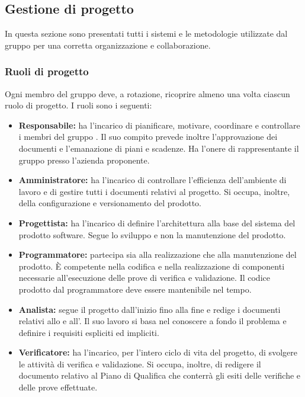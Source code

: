 \subsection{Gestione di progetto}
In questa sezione sono presentati tutti i sistemi e le metodologie utilizzate dal gruppo per una corretta organizzazione e collaborazione.
\subsubsection{Ruoli di progetto}
Ogni membro del gruppo deve, a rotazione, ricoprire almeno una volta ciascun ruolo di progetto.
I ruoli sono i seguenti:
\begin{itemize}
\item \textbf{Responsabile:} ha l'incarico di pianificare, motivare, coordinare e controllare i membri del gruppo \Gruppo.
Il suo compito prevede inoltre l'approvazione dei documenti e l'emanazione di piani e scadenze.
Ha l'onere di rappresentante il gruppo presso l'azienda proponente.
\item \textbf{Amministratore:} ha l'incarico di controllare l'efficienza dell'ambiente di lavoro e di gestire tutti i documenti relativi al progetto.
Si occupa, inoltre, della configurazione e versionamento del prodotto.
\item \textbf{Progettista:} ha l'incarico di definire l'architettura alla base del sistema del prodotto software.
Segue lo sviluppo e non la manutenzione del prodotto.
\item \textbf{Programmatore:} partecipa sia alla realizzazione che alla manutenzione del prodotto.
È competente nella codifica e nella realizzazione di componenti necessarie all’esecuzione delle prove di verifica e validazione.
Il codice prodotto dal programmatore deve essere mantenibile nel tempo.
\item \textbf{Analista:} segue il progetto dall'inizio fino alla fine e redige i documenti relativi allo \SdF{} e all'\AdR{}.
Il suo lavoro si basa nel conoscere a fondo il problema e definire i requisiti espliciti ed impliciti.
\item \textbf{Verificatore:} ha l'incarico, per l'intero ciclo di vita del progetto, di svolgere le attività di verifica e validazione.
Si occupa, inoltre, di redigere il documento relativo al Piano di Qualifica che conterrà gli esiti delle verifiche e delle prove effettuate.
\end{itemize}

